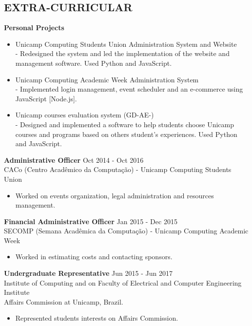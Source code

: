 \documentclass[margin, 10pt]{res} %
\begin{document}
\begin{resume}
\section{EXTRA-CURRICULAR}
{\bf Personal Projects}
\begin{itemize} \itemsep -1pt %
\item Unicamp Computing Students Union Administration System and Website\\
	 - Redesigned the system and led the implementation of the website and management software. Used Python and JavaScript.
\item Unicamp Computing Academic Week Administration System\\
	 - Implemented login management, event scheduler and an e-commerce using \\ JavaScript [Node.js].
\item Unicamp courses evaluation system (GD-AE-)\\
	 - Designed and implemented a software to help students choose Unicamp courses and programs based on others student's experiences. Used Python and JavaScript.
\end{itemize}

{\bf Administrative Officer} \hfill Oct 2014 - Oct 2016 \\
CACo (Centro Acadêmico da Computação) - Unicamp Computing Students Union
\begin{itemize} \itemsep -1pt %
\item Worked on events organization, legal administration and resources management.
\end{itemize}

{\bf Financial Administrative Officer} \hfill Jan 2015 - Dec 2015 \\
SECOMP (Semana Acadêmica da Computação) - Unicamp Computing Academic Week
\begin{itemize} \itemsep -1pt %
\item Worked in estimating costs and contacting sponsors.
\end{itemize}

{\bf Undergraduate Representative} \hfill Jun 2015 - Jun 2017 \\
Institute of Computing and on Faculty of Electrical and Computer Engineering Institute \\ Affairs Commission at Unicamp, Brazil.
\begin{itemize} \itemsep -1pt %
\item Represented students interests on Affairs Commission.
\end{itemize}

\end{resume}
\end{document}
